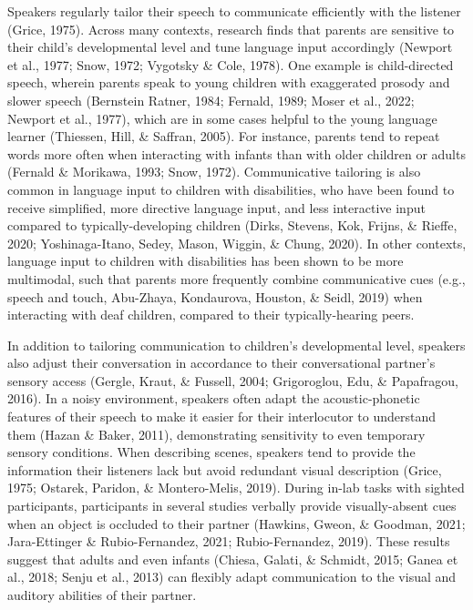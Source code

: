 \documentclass[
  man,floatsintext]{apa6}
\begin{document}
Speakers regularly tailor their speech to communicate efficiently with the listener (Grice, 1975). Across many contexts, research finds that parents are sensitive to their child's developmental level and tune language input accordingly (Newport et al., 1977; Snow, 1972; Vygotsky \& Cole, 1978). One example is child-directed speech, wherein parents speak to young children with exaggerated prosody and slower speech (Bernstein Ratner, 1984; Fernald, 1989; Moser et al., 2022; Newport et al., 1977), which are in some cases helpful to the young language learner (Thiessen, Hill, \& Saffran, 2005). For instance, parents tend to repeat words more often when interacting with infants than with older children or adults (Fernald \& Morikawa, 1993; Snow, 1972). Communicative tailoring is also common in language input to children with disabilities, who have been found to receive simplified, more directive language input, and less interactive input compared to typically-developing children (Dirks, Stevens, Kok, Frijns, \& Rieffe, 2020; Yoshinaga-Itano, Sedey, Mason, Wiggin, \& Chung, 2020). In other contexts, language input to children with disabilities has been shown to be more multimodal, such that parents more frequently combine communicative cues (e.g., speech and touch, Abu-Zhaya, Kondaurova, Houston, \& Seidl, 2019) when interacting with deaf children, compared to their typically-hearing peers.

In addition to tailoring communication to children's developmental level, speakers also adjust their conversation in accordance to their conversational partner's sensory access (Gergle, Kraut, \& Fussell, 2004; Grigoroglou, Edu, \& Papafragou, 2016). In a noisy environment, speakers often adapt the acoustic-phonetic features of their speech to make it easier for their interlocutor to understand them (Hazan \& Baker, 2011), demonstrating sensitivity to even temporary sensory conditions. When describing scenes, speakers tend to provide the information their listeners lack but avoid redundant visual description (Grice, 1975; Ostarek, Paridon, \& Montero-Melis, 2019). During in-lab tasks with sighted participants, participants in several studies verbally provide visually-absent cues when an object is occluded to their partner (Hawkins, Gweon, \& Goodman, 2021; Jara-Ettinger \& Rubio-Fernandez, 2021; Rubio-Fernandez, 2019). These results suggest that adults and even infants (Chiesa, Galati, \& Schmidt, 2015; Ganea et al., 2018; Senju et al., 2013) can flexibly adapt communication to the visual and auditory abilities of their partner.
\end{document}

